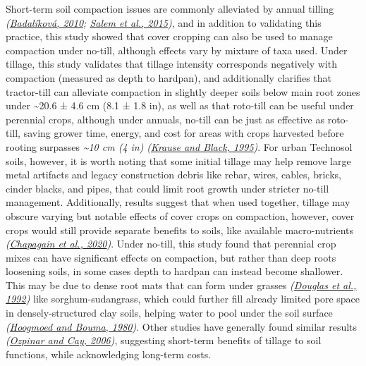 \documentclass[
  12pt,
]{article}
\begin{document}
Short-term soil compaction issues are commonly alleviated by annual tilling \emph{(\protect\hyperlink{ref-badalikova10}{Badalíková, 2010}; \protect\hyperlink{ref-salem15}{Salem et al., 2015})}, and in addition to validating this practice, this study showed that cover cropping can also be used to manage compaction under no-till, although effects vary by mixture of taxa used.
Under tillage, this study validates that tillage intensity corresponds negatively with compaction (measured as depth to hardpan), and additionally clarifies that tractor-till can alleviate compaction in slightly deeper soils below main root zones under
\textasciitilde20.6 ±
4.6 cm
(8.1 ±
1.8 in),
as well as that roto-till can be useful under perennial crops, although under annuals, no-till can be just as effective as roto-till, saving grower time, energy, and cost for areas with crops harvested before rooting surpasses \emph{\textasciitilde10 cm (4 in)} \emph{(\protect\hyperlink{ref-krause95}{Krause and Black, 1995})}.
For urban Technosol soils, however, it is worth noting that some initial tillage may help remove large metal artifacts and legacy construction debris like rebar, wires, cables, bricks, cinder blacks, and pipes, that could limit root growth under stricter no-till management.
Additionally, results suggest that when used together, tillage may obscure varying but notable effects of cover crops on compaction, however, cover crops would still provide separate benefits to soils, like available macro-nutrients \emph{(\protect\hyperlink{ref-chapagain20}{Chapagain et al., 2020})}.
Under no-till, this study found that perennial crop mixes can have significant effects on compaction, but rather than deep roots loosening soils, in some cases depth to hardpan can instead become shallower.
This may be due to dense root mats that can form under grasses \emph{(\protect\hyperlink{ref-douglas92}{Douglas et al., 1992})} like sorghum-sudangrass, which could further fill already limited pore space in densely-structured clay soils, helping water to pool under the soil surface \emph{(\protect\hyperlink{ref-hoogmoed80}{Hoogmoed and Bouma, 1980})}.
Other studies have generally found similar results \emph{(\protect\hyperlink{ref-ozpinar06}{Ozpinar and Cay, 2006})}, suggesting short-term benefits of tillage to soil functions, while acknowledging long-term costs.
\end{document}
